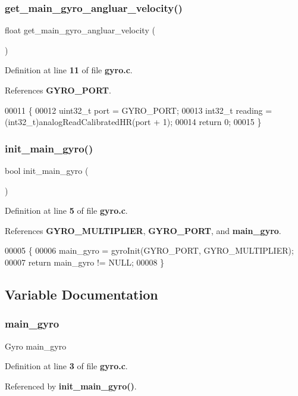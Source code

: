 \subsubsection{get\+\_\+main\+\_\+gyro\+\_\+angluar\+\_\+velocity()}
{\footnotesize\ttfamily float get\+\_\+main\+\_\+gyro\+\_\+angluar\+\_\+velocity (\begin{DoxyParamCaption}{ }\end{DoxyParamCaption})}



Definition at line \textbf{ 11} of file \textbf{ gyro.\+c}.



References \textbf{ G\+Y\+R\+O\+\_\+\+P\+O\+RT}.


\begin{DoxyCode}
00011                                        \{
00012   uint32\_t port = GYRO_PORT;
00013   int32\_t reading = (int32\_t)analogReadCalibratedHR(port + 1);
00014     \textcolor{keywordflow}{return} 0;
00015 \}
\end{DoxyCode}
\mbox{\label{gyro_8c_a47c0a78a867be91a28e278bf433d699c}} 
\subsubsection{init\+\_\+main\+\_\+gyro()}
{\footnotesize\ttfamily bool init\+\_\+main\+\_\+gyro (\begin{DoxyParamCaption}{ }\end{DoxyParamCaption})}



Definition at line \textbf{ 5} of file \textbf{ gyro.\+c}.



References \textbf{ G\+Y\+R\+O\+\_\+\+M\+U\+L\+T\+I\+P\+L\+I\+ER}, \textbf{ G\+Y\+R\+O\+\_\+\+P\+O\+RT}, and \textbf{ main\+\_\+gyro}.


\begin{DoxyCode}
00005                       \{
00006   main_gyro = gyroInit(GYRO_PORT, GYRO_MULTIPLIER);
00007   \textcolor{keywordflow}{return} main_gyro != NULL;
00008 \}
\end{DoxyCode}


\subsection{Variable Documentation}
\mbox{\label{gyro_8c_ab848a00cddfc20556aef426cf11f9a85}} 
\subsubsection{main\+\_\+gyro}
{\footnotesize\ttfamily Gyro main\+\_\+gyro\hspace{0.3cm}{\ttfamily [static]}}



Definition at line \textbf{ 3} of file \textbf{ gyro.\+c}.



Referenced by \textbf{ init\+\_\+main\+\_\+gyro()}.

